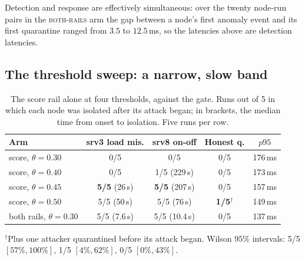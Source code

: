 \documentclass[10pt,twocolumn,letterpaper]{article}
\newcommand{\armfull}{\textsc{both-rails}}
\begin{document}
Detection and response are effectively simultaneous: over the twenty
node-run pairs in the \armfull{} arm the gap between a node's first anomaly
event and its first quarantine ranged from $3.5$ to $12.5$\,ms, so the
latencies above are detection latencies. 

\subsection{The threshold sweep: a narrow, slow band}
\label{sec:res:sweep}

\begin{table}[t]
\caption{The score rail alone at four thresholds, against the gate. Runs out of 5
in which each node was isolated after its attack began; in brackets, the median
time from onset to isolation. Five runs per row.}
\label{tab:sweep}
\centering\footnotesize
\setlength{\tabcolsep}{3.5pt}
\begin{tabular}{@{}lcccc@{}}
\toprule
\textbf{Arm} & \textbf{srv3 load mis.} & \textbf{srv8 on-off} & \textbf{Honest q.} & $p95$\\
\midrule
score, $\theta{=}0.30$ & 0/5 & 0/5 & 0/5 & 176\,ms\\
score, $\theta{=}0.40$ & 0/5 & 1/5 (229\,s) & 0/5 & 173\,ms\\
score, $\theta{=}0.45$ & \textbf{5/5} (26\,s) & \textbf{5/5} (207\,s) & 0/5 & 157\,ms\\
score, $\theta{=}0.50$ & 5/5 (50\,s) & 5/5 (76\,s) & \textbf{1/5}$^{\dagger}$ & 149\,ms\\
\midrule
both rails, $\theta{=}0.30$ & 5/5 (7.6\,s) & 5/5 (10.4\,s) & 0/5 & 137\,ms\\
\bottomrule
\end{tabular}

\vspace{3pt}
\begin{minipage}{\columnwidth}\scriptsize\raggedright
$^{\dagger}$Plus one attacker quarantined before its attack began. Wilson $95\%$
intervals: 5/5 $[57\%,100\%]$, 1/5 $[4\%,62\%]$, 0/5 $[0\%,43\%]$.
\end{minipage}
\end{table}
\end{document}
